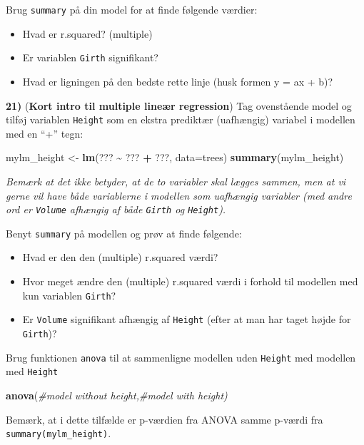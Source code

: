 \documentclass[
]{book}
\newenvironment{Shaded}{\begin{snugshade}}{\end{snugshade}}
\newcommand{\AttributeTok}[1]{\textcolor[rgb]{0.27,0.27,0.27}{#1}}
\newcommand{\CommentTok}[1]{\textcolor[rgb]{0.37,0.37,0.37}{\textit{#1}}}
\newcommand{\FunctionTok}[1]{\textcolor[rgb]{0.27,0.27,0.27}{\textbf{#1}}}
\newcommand{\NormalTok}[1]{#1}
\newcommand{\OtherTok}[1]{\textcolor[rgb]{0.37,0.37,0.37}{#1}}
\newcommand{\SpecialCharTok}[1]{\textcolor[rgb]{0.43,0.43,0.43}{\textbf{#1}}}
\providecommand{\tightlist}{%
  \setlength{\itemsep}{0pt}\setlength{\parskip}{0pt}}
\begin{document}
Brug \texttt{summary} på din model for at finde følgende værdier:

\begin{itemize}
\tightlist
\item
  Hvad er r.squared? (multiple)
\item
  Er variablen \texttt{Girth} signifikant?
\item
  Hvad er ligningen på den bedste rette linje (husk formen y = ax + b)?
\end{itemize}

\textbf{21)} (\textbf{Kort intro til multiple lineær regression}) Tag ovenstående model og tilføj variablen \texttt{Height} som en ekstra prediktær (uafhængig) variabel i modellen med en ``+'' tegn:

\begin{Shaded}
\begin{Highlighting}[]
\NormalTok{mylm\_height }\OtherTok{\textless{}{-}} \FunctionTok{lm}\NormalTok{(??? }\SpecialCharTok{\textasciitilde{}}\NormalTok{ ??? }\SpecialCharTok{+}\NormalTok{ ???, }\AttributeTok{data=}\NormalTok{trees) }
\FunctionTok{summary}\NormalTok{(mylm\_height)}
\end{Highlighting}
\end{Shaded}

\emph{Bemærk at det ikke betyder, at de to variabler skal lægges sammen, men at vi gerne vil have både variablerne i modellen som uafhængig variabler (med andre ord er \texttt{Volume} afhængig af både \texttt{Girth} og \texttt{Height}).}

Benyt \texttt{summary} på modellen og prøv at finde følgende:

\begin{itemize}
\tightlist
\item
  Hvad er den den (multiple) r.squared værdi?
\item
  Hvor meget ændre den (multiple) r.squared værdi i forhold til modellen med kun variablen \texttt{Girth}?
\item
  Er \texttt{Volume} signifikant afhængig af \texttt{Height} (efter at man har taget højde for \texttt{Girth})?
\end{itemize}

Brug funktionen \texttt{anova} til at sammenligne modellen uden \texttt{Height} med modellen med \texttt{Height}

\begin{Shaded}
\begin{Highlighting}[]
\FunctionTok{anova}\NormalTok{(}\CommentTok{\#model without height,\#model with height)}
\end{Highlighting}
\end{Shaded}

Bemærk, at i dette tilfælde er p-værdien fra ANOVA samme p-værdi fra \texttt{summary(mylm\_height)}.
\end{document}
